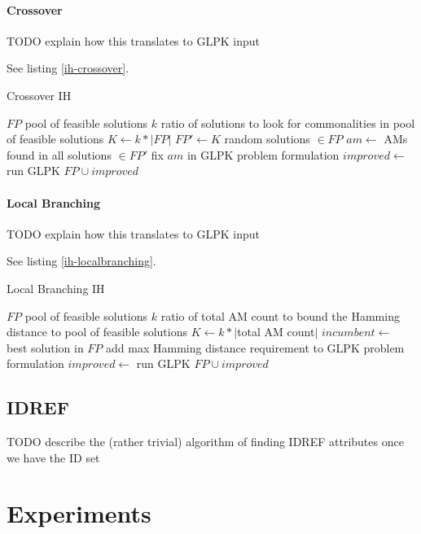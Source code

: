 \documentclass[a4paper,12pt,oneside]{report}
\begin{document}
\subsubsection{Crossover}

TODO explain how this translates to GLPK input

See listing \ref{ih-crossover}.

\begin{algorithm}
\caption{Crossover IH}
\label{ih-crossover}
\begin{algorithmic}
\REQUIRE $FP$ pool of feasible solutions
\REQUIRE $k$ ratio of solutions to look for commonalities in
\ENSURE pool of feasible solutions
\STATE $K \gets k * |FP|$
\STATE $FP' \gets K$ random solutions $\in FP$
\STATE $am \gets$ AMs found in all solutions $\in FP'$
\STATE fix $am$ in GLPK problem formulation
\STATE $improved \gets $ run GLPK
\RETURN $FP \cup improved$
\end{algorithmic}
\end{algorithm}

\subsubsection{Local Branching}

TODO explain how this translates to GLPK input

See listing \ref{ih-localbranching}.

\begin{algorithm}
\caption{Local Branching IH}
\label{ih-localbranching}
\begin{algorithmic}
\REQUIRE $FP$ pool of feasible solutions
\REQUIRE $k$ ratio of total AM count to bound the Hamming distance to
\ENSURE pool of feasible solutions
\STATE $K \gets k * |$total AM count$|$
\STATE $incumbent \gets $ best solution in $FP$ 
\STATE add max Hamming distance requirement to GLPK problem formulation
\STATE $improved \gets $ run GLPK
\RETURN $FP \cup improved$
\end{algorithmic}
\end{algorithm}

\section{IDREF}

TODO describe the (rather trivial) algorithm of finding IDREF attributes once we have the ID set

\chapter{Experiments}
\end{document}
